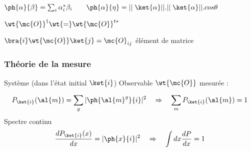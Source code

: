 $\ph{\alpha}{\beta}=\sum_i\alpha_i^*\beta_i \qquad
 \ph{\alpha}{\eta}=||\;\ket{\alpha}||.||\;\ket{\alpha}||.cos\theta$

$\wt{\mc{O}}^\dagger\wt{=}\wt{\mc{O}}^{t*}$

$\bra{i}\wt{\mc{O}}\ket{j}=\mc{O}_{ij}$ élément de matrice

\subsubsection{Théorie de la mesure}
Système (dans l'état initial $\ket{i}$) \qquad Observable $\wt{\mc{O}}$ mesurée :

\[
P_{\ket{i}}(\al{m})=\sum_g|\ph{\al{m}^g}{i}|^2 \quad \Rightarrow \quad 
\sum_mP_{\ket{i}}(\al{m})=1
\]
Spectre continu
\[
\frac{dP_{\ket{i}}(x)}{dx}=|\ph{x}{i}|^2 \quad \Rightarrow \quad 
\int dx\frac{dP}{dx}=1
\]

